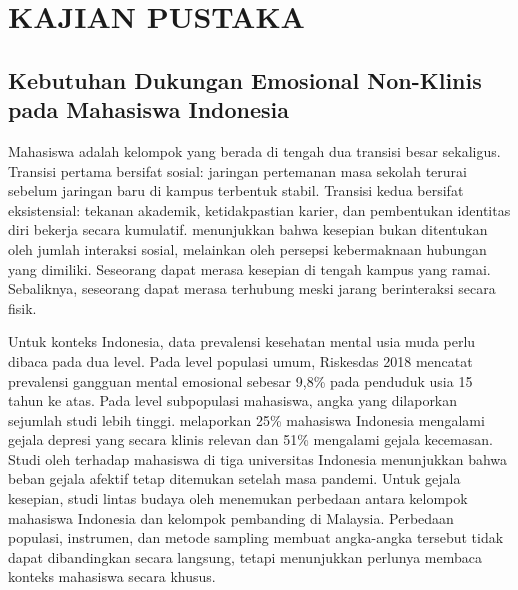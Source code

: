 

\chapter{KAJIAN PUSTAKA}
\label{ch:kajian-pustaka}


\section{Kebutuhan Dukungan Emosional Non-Klinis pada Mahasiswa Indonesia}
\label{sec:dukungan-non-klinis}

Mahasiswa adalah kelompok yang berada di tengah dua transisi besar sekaligus. Transisi pertama bersifat sosial: jaringan pertemanan masa sekolah terurai sebelum jaringan baru di kampus terbentuk stabil. Transisi kedua bersifat eksistensial: tekanan akademik, ketidakpastian karier, dan pembentukan identitas diri bekerja secara kumulatif. \textcite{hawkleyCacioppo2010} menunjukkan bahwa kesepian bukan ditentukan oleh jumlah interaksi sosial, melainkan oleh persepsi kebermaknaan hubungan yang dimiliki. Seseorang dapat merasa kesepian di tengah kampus yang ramai. Sebaliknya, seseorang dapat merasa terhubung meski jarang berinteraksi secara fisik.

Untuk konteks Indonesia, data prevalensi kesehatan mental usia muda perlu dibaca pada dua level. Pada level populasi umum, Riskesdas 2018 \parencite{kemenkes2019} mencatat prevalensi gangguan mental emosional sebesar 9,8\% pada penduduk usia 15 tahun ke atas. Pada level subpopulasi mahasiswa, angka yang dilaporkan sejumlah studi lebih tinggi. \textcite{astutik2020} melaporkan 25\% mahasiswa Indonesia mengalami gejala depresi yang secara klinis relevan dan 51\% mengalami gejala kecemasan. Studi oleh \textcite{putri2024} terhadap mahasiswa di tiga universitas Indonesia menunjukkan bahwa beban gejala afektif tetap ditemukan setelah masa pandemi. Untuk gejala kesepian, studi lintas budaya oleh \textcite{ashilah2024} menemukan perbedaan antara kelompok mahasiswa Indonesia dan kelompok pembanding di Malaysia. Perbedaan populasi, instrumen, dan metode sampling membuat angka-angka tersebut tidak dapat dibandingkan secara langsung, tetapi menunjukkan perlunya membaca konteks mahasiswa secara khusus.

